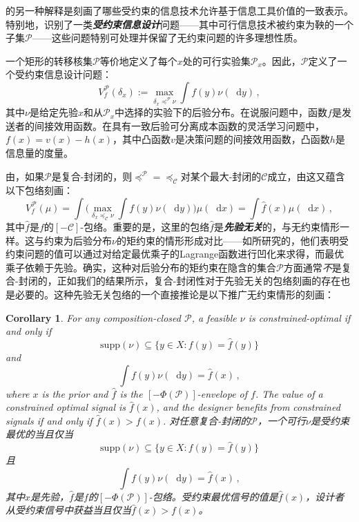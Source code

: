 \documentclass[12pt,letterpaper]{article}
\newenvironment{original}{\color{black}}{}
\newenvironment{translation}{\color{blue}}{}
\newcommand*\supp{\mathrm{supp}}
\theoremstyle{plain}
\newtheorem{cor}{Corollary}
\theoremstyle{definition}
\theoremstyle{remark}
\newcommand{\Pc}{\mathcal{P}}
\renewcommand*\d{\mathop{}\!\mathrm{d}}
\theoremstyle{definition}
\begin{document}
\begin{translation}
的另一种解释是刻画了哪些受约束的信息技术允许基于信息工具价值的一致表示。特别地，识别了一类\textit{\textbf{受约束信息设计}}问题——其中可行信息技术被约束为鞅的一个子集$\Pc$——这些问题特别可处理并保留了无约束问题的许多理想性质。

一个矩形的转移核集$\Pc$等价地定义了每个$x$处的可行实验集$\mathcal{P}_x$。因此，$\Pc$定义了一个受约束信息设计问题：
\[V^{\mathcal{P}}_f(\delta_{x}) := \max_{\delta_{x} \preceq^{\mathcal{P}} \nu} \int f(y)  \nu(\d y)\,,\]
其中$\nu$是给定先验$x$和从$\mathcal{P}_x$中选择的实验下的后验分布。在说服问题中，函数$f$是发送者的间接效用函数。在具有一致后验可分离成本函数的灵活学习问题中，$f(x) = v(x) - h(x)$，其中凸函数$v$是决策问题的间接效用函数，凸函数$h$是信息量的度量。

由，如果$\Pc$是复合-封闭的，则$\preceq^{\mathcal{P}} = \preceq_{\mathcal{C}}$对某个最大-封闭的$\mathcal{C}$成立，由这又蕴含以下包络刻画：
\[V^{\mathcal{P}}_f(\mu) = \int \Big( \max_{\delta_{x} \preceq_{\mathcal{C}} \nu} \int f(y)  \nu(\d y)\Big) \mu(\d x) = \int \widehat{f}(x)  \mu(\d x) \,,\]
其中$\widehat{f}$是$f$的$[-\mathcal{C}]$-包络。重要的是，这里的包络$\widehat{f}$是\textit{\textbf{先验无关}}的，与无约束情形一样。这与约束为后验分布$\nu$的矩约束的情形形成对比——如\citet{doval2024constrained}所研究的，他们表明受约束问题的值可以通过对给定最优乘子的Lagrange函数进行凹化来求得，而最优乘子依赖于先验。确实，这种对后验分布的矩约束在隐含的集合$\mathcal{P}$方面通常\textit{不}是复合-封闭的，正如我们的结果所示，复合-封闭性对于先验无关的包络刻画的存在也是必要的。这种先验无关包络的一个直接推论是以下推广无约束情形的刻画：
\end{translation}

\begin{cor}\label{cor:envelope}
\begin{original}
For any composition-closed $\mathcal{P}$, a feasible $\nu$ is constrained-optimal if and only if
\[\supp(\nu) \subseteq \Big\{y \in X: f(y) = \widehat{f}(y)\Big\}\]
and
\[\int f(y)\nu(\d y) = \widehat{f}(x)\,, \]
where $x$ is the prior and $\widehat{f}$ is the $[-\Phi(\mathcal{P})]$-envelope of $f$. The value of a constrained optimal signal is $\widehat{f}(x)$, and the designer benefits from constrained signals if and only if $\widehat{f}(x) > f(x)$.
\end{original}
\begin{translation}
对任意复合-封闭的$\mathcal{P}$，一个可行$\nu$是受约束最优的当且仅当
\[\supp(\nu) \subseteq \{y \in X: f(y) = \widehat{f}(y)\}\]
且
\[\int f(y)\nu(\d y) = \widehat{f}(x)\,, \]
其中$x$是先验，$\widehat{f}$是$f$的$[-\Phi(\mathcal{P})]$-包络。受约束最优信号的值是$\widehat{f}(x)$，设计者从受约束信号中获益当且仅当$\widehat{f}(x) > f(x)$。
\end{translation}
\end{cor}
\end{document}
